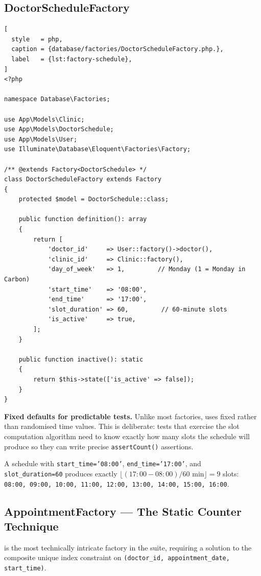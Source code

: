 \subsection{DoctorScheduleFactory}

\begin{lstlisting}[
  style   = php,
  caption = {database/factories/DoctorScheduleFactory.php.},
  label   = {lst:factory-schedule},
]
<?php

namespace Database\Factories;

use App\Models\Clinic;
use App\Models\DoctorSchedule;
use App\Models\User;
use Illuminate\Database\Eloquent\Factories\Factory;

/** @extends Factory<DoctorSchedule> */
class DoctorScheduleFactory extends Factory
{
    protected $model = DoctorSchedule::class;

    public function definition(): array
    {
        return [
            'doctor_id'     => User::factory()->doctor(),
            'clinic_id'     => Clinic::factory(),
            'day_of_week'   => 1,         // Monday (1 = Monday in Carbon)
            'start_time'    => '08:00',
            'end_time'      => '17:00',
            'slot_duration' => 60,         // 60-minute slots
            'is_active'     => true,
        ];
    }

    public function inactive(): static
    {
        return $this->state(['is_active' => false]);
    }
}
\end{lstlisting}

\textbf{Fixed defaults for predictable tests.} Unlike most factories,
 uses fixed rather than randomised
time values. This is deliberate: tests that exercise the slot
computation algorithm need to know exactly how many slots the schedule
will produce so they can write precise \texttt{assertCount()} assertions.

A schedule with \texttt{start\_time='08:00'}, \texttt{end\_time='17:00'},
and \texttt{slot\_duration=60} produces exactly
$\lfloor(17{:}00 - 08{:}00) / 60\text{ min}\rfloor = 9$ slots:
\texttt{08:00, 09:00, 10:00, 11:00, 12:00, 13:00, 14:00, 15:00, 16:00}.

\subsection{AppointmentFactory --- The Static Counter Technique}
\label{sec:appt-factory}

 is the most technically intricate factory
in the suite, requiring a solution to the composite unique index
constraint on \texttt{(doctor\_id, appointment\_date, start\_time)}.

